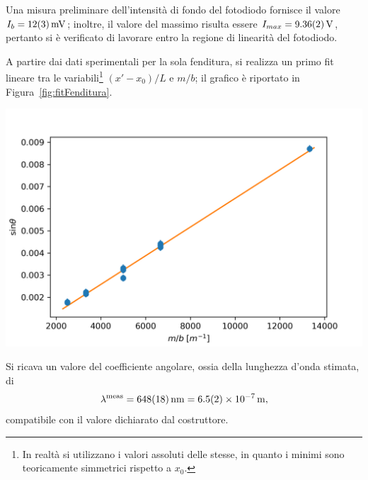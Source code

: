 \documentclass[10pt,oneside,a4paper]{article}
\newenvironment{Figure}
  {\par\medskip\noindent\minipage{\linewidth}}
  {\endminipage\par\medskip}
\begin{document}
\begin{multicols}{2}
Una misura preliminare dell'intensità di fondo del fotodiodo fornisce il valore ${I_b = \SI{12 \pm 3}{mV}}$; inoltre, il valore del massimo risulta essere $I_{max} = \SI{9.36 \pm 0.02}{V}$, pertanto si è verificato di lavorare entro la regione di linearità del fotodiodo.

A partire dai dati sperimentali per la sola fenditura, si realizza un primo fit lineare tra le variabili\footnote{In realtà si utilizzano i valori assoluti delle stesse, in quanto i minimi sono teoricamente simmetrici rispetto a $x_0$.} $(x'-x_0) / L$ e $m/b$; il grafico è riportato in Figura~\ref{fig:fitFenditura}. 

\begin{Figure}
	\begin{center}
	\includegraphics[width=1.1\linewidth]{fitFenditura.png}
	\label{fig:fitFenditura}
	\end{center}
\end{Figure}

Si ricava un valore del coefficiente angolare, ossia della lunghezza d'onda stimata, di
\[
\lambda^{\text{meas}} = \SI{648 \pm 18}{nm} = \SI{6.5 \pm 0.2 e-7}{m},
\]
compatibile con il valore dichiarato dal costruttore. 


\end{multicols}
\end{document}
